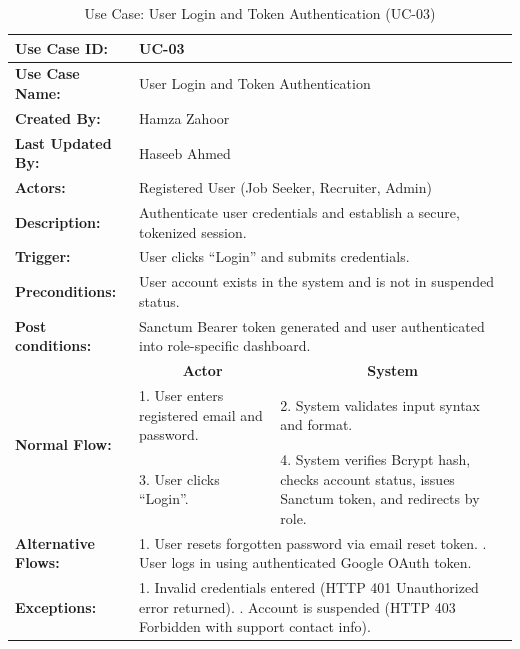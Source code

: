 \begin{table}[H]
\centering
\small
\caption{Use Case: User Login and Token Authentication (UC-03)}
\label{tab:uc03_spec}
\begin{tabular}{|p{3.2cm}|p{5.5cm}|p{5.5cm}|}
\hline
\textbf{Use Case ID:} & \multicolumn{2}{p{11.4cm}|}{UC-03} \\ \hline
\textbf{Use Case Name:} & \multicolumn{2}{p{11.4cm}|}{User Login and Token Authentication} \\ \hline
\textbf{Created By:} & \multicolumn{2}{p{11.4cm}|}{Hamza Zahoor} \\ \hline
\textbf{Last Updated By:} & \multicolumn{2}{p{11.4cm}|}{Haseeb Ahmed} \\ \hline
\textbf{Actors:} & \multicolumn{2}{p{11.4cm}|}{Registered User (Job Seeker, Recruiter, Admin)} \\ \hline
\textbf{Description:} & \multicolumn{2}{p{11.4cm}|}{Authenticate user credentials and establish a secure, tokenized session.} \\ \hline
\textbf{Trigger:} & \multicolumn{2}{p{11.4cm}|}{User clicks ``Login'' and submits credentials.} \\ \hline
\textbf{Preconditions:} & \multicolumn{2}{p{11.4cm}|}{User account exists in the system and is not in suspended status.} \\ \hline
\textbf{Post conditions:} & \multicolumn{2}{p{11.4cm}|}{Sanctum Bearer token generated and user authenticated into role-specific dashboard.} \\ \hline
\multirow{3}{*}{\textbf{Normal Flow:}} & \multicolumn{1}{c|}{\textbf{Actor}} & \multicolumn{1}{c|}{\textbf{System}} \\ \cline{2-3}
& 1. User enters registered email and password. & 2. System validates input syntax and format. \vspace{2pt} \\
& 3. User clicks ``Login''. & 4. System verifies Bcrypt hash, checks account status, issues Sanctum token, and redirects by role. \\ \hline
\textbf{Alternative Flows:} & \multicolumn{2}{p{11.4cm}|}{1. User resets forgotten password via email reset token. \newline 2. User logs in using authenticated Google OAuth token.} \\ \hline
\textbf{Exceptions:} & \multicolumn{2}{p{11.4cm}|}{1. Invalid credentials entered (HTTP 401 Unauthorized error returned). \newline 2. Account is suspended (HTTP 403 Forbidden with support contact info).} \\ \hline
\end{tabular}
\end{table}

